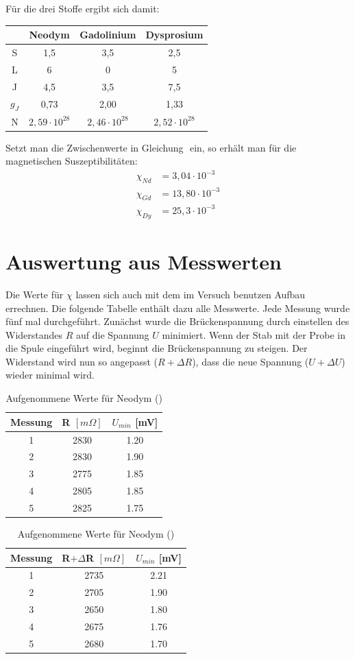 Für die drei Stoffe ergibt sich damit:

\begin{table}[H]
\begin{tabular}{c|c|c|c|}
   & Neodym & Gadolinium & Dysprosium\\ \hline
  S& 1,5 & 3,5 & 2,5 \\ \hline
  L& 6   & 0   & 5   \\ \hline
  J& 4,5 & 3,5 & 7,5 \\ \hline
  $g_J$& 0,73 & 2,00 & 1,33 \\ \hline
N & $2,59\cdot10^{28}$ & $2,46 \cdot10^{28}$ & $2,52\cdot10^{28}$\\ \hline
\end{tabular}
\end{table}

Setzt man die Zwischenwerte in Gleichung $ $ ein, so erhält man für die magnetischen Suszeptibilitäten:
\begin{align*}
\chi_{Nd}&=3,04\cdot10^{-3}\\
\chi_{Gd}&=13,80\cdot10^{-3}\\
\chi_{Dy}&=25,3\cdot10^{-3}
\end{align*}

\section{Auswertung aus Messwerten}
Die Werte für $\chi$ lassen sich auch mit dem im Versuch benutzen Aufbau errechnen. Die folgende Tabelle enthält dazu alle Messwerte. Jede Messung wurde fünf mal durchgeführt. Zunächst wurde die Brückenspannung durch einstellen des Widerstandes $R$ auf die Spannung $U$ minimiert. Wenn der Stab mit der Probe in die Spule eingeführt wird, beginnt die Brückenspannung zu steigen. Der Widerstand wird nun so angepasst ($R + \Delta R$), dass die neue Spannung ($U + \Delta U$) wieder minimal wird.

\begin{table}[htbp]
\begin{tabular}{|c|c|c|}
Messung	& R $[m\Omega]$	&$U_{min}$ [mV]\\ \hline
1&	2830&	1.20\\ \hline
2&	2830&	1.90\\ \hline
3&	2775&	1.85\\ \hline
4&	2805&	1.85\\ \hline
5&	2825&	1.75\\ \hline
\end{tabular}
\begin{tabular}{|c|c|c|}
Messung	& R$+\Delta$R $[m\Omega]$&$U_{min}$ [mV] \\ \hline
1&	2735&	2.21\\ \hline
2&	2705&	1.90\\ \hline
3&	2650&	1.80\\ \hline
4&	2675&	1.76\\ \hline
5&	2680&	1.70\\ \hline
\end{tabular}
\caption{Aufgenommene Werte für Neodym ()}
\label{t_werte}
\end{table}

